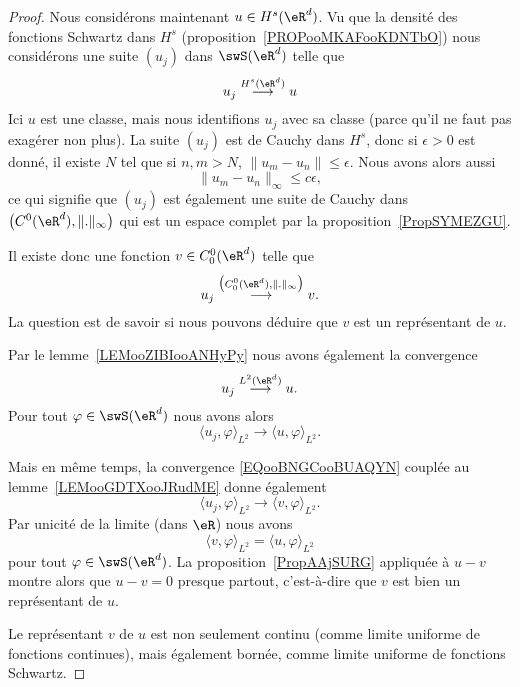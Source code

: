 \begin{proof}
    Nous considérons maintenant \( u\in H^s(\eR^d)\). Vu que la densité des fonctions Schwartz dans \( H^s\) (proposition~\ref{PROPooMKAFooKDNTbO}) nous considérons une suite \( (u_j)\) dans \( \swS(\eR^d)\) telle que
    \begin{equation}
        u_j\stackrel{H^s(\eR^d)}{\longrightarrow}u
    \end{equation}
    Ici \( u\) est une classe, mais nous identifions \( u_j\) avec sa classe (parce qu'il ne faut pas exagérer non plus). La suite \( (u_j)\) est de Cauchy dans \( H^s\), donc si \( \epsilon>0\) est donné, il existe \( N\) tel que si \( n,m>N\), \( \| u_m-u_n \|\leq \epsilon\). Nous avons alors aussi
    \begin{equation}
        \| u_m-u_n \|_{\infty}\leq c\epsilon,
    \end{equation}
    ce qui signifie que \( (u_j)\) est également une suite de Cauchy dans \( \big( C^0(\eR^d),\| . \|_{\infty} \big)\) qui est un espace complet par la proposition~\ref{PropSYMEZGU}.

    Il existe donc une fonction \( v\in C_0^0(\eR^d)\) telle que
    \begin{equation}        \label{EQooBNGCooBUAQYN}
        u_j\stackrel{\big( C^0_0(\eR^d), \| . \|_{\infty} \big)}{\longrightarrow}v.
    \end{equation}
    La question est de savoir si nous pouvons déduire que \( v\) est un représentant de \( u\).

    Par le lemme~\ref{LEMooZIBIooANHyPy} nous avons également la convergence
    \begin{equation}
        u_j\stackrel{L^2(\eR^d)}{\longrightarrow} u.
    \end{equation}
    Pour tout \( \varphi\in \swS(\eR^d)\) nous avons alors
    \begin{equation}
        \langle u_j, \varphi\rangle_{L^2}\to\langle u, \varphi\rangle_{L^2}.
    \end{equation}

    Mais en même temps, la convergence \eqref{EQooBNGCooBUAQYN} couplée au lemme~\ref{LEMooGDTXooJRudME} donne également
    \begin{equation}
        \langle u_j, \varphi\rangle_{L^2}\to \langle v, \varphi\rangle_{L^2}.
    \end{equation}
    Par unicité de la limite (dans \( \eR\)) nous avons
    \begin{equation}
        \langle v, \varphi\rangle_{L^2}=\langle u, \varphi\rangle_{L^2}
    \end{equation}
    pour tout \( \varphi\in\swS(\eR^d)\). La proposition~\ref{PropAAjSURG} appliquée à \( u-v\) montre alors que \( u-v=0\) presque partout, c'est-à-dire que \( v\) est bien un représentant de \( u\).

    Le représentant \( v\) de \( u\) est non seulement continu (comme limite uniforme de fonctions continues), mais également bornée, comme limite uniforme de fonctions Schwartz.
\end{proof}

